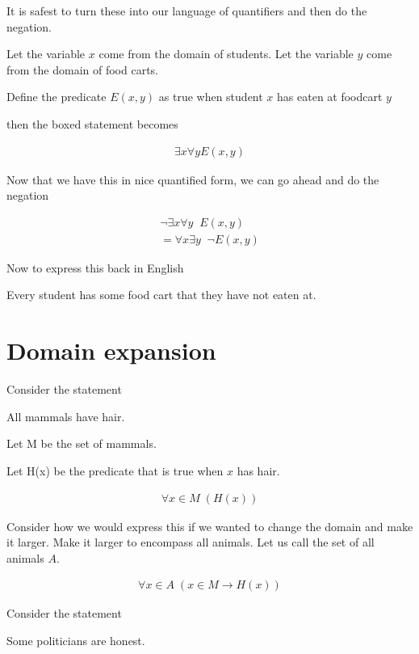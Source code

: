 \documentclass[12pt]{article}
\begin{document}
\medskip


\medskip

It is safest to turn these into our language of quantifiers and then do the negation.

Let the variable $x$ come from the domain of students. Let the variable $y$ come from the domain of food carts.

Define the predicate $E(x,y)$ as true when student $x$ has eaten at foodcart $y$

then the boxed statement becomes

\begin{align*}
\exists x \forall y E(x,y)
\end{align*}

Now that we have this in nice quantified form, we can go ahead and do the negation

\begin{align*}
\neg \exists x \forall y \; \; E(x,y) \\
= \forall x \exists y \; \; \neg E(x,y)
\end{align*}

Now to express this back in English

Every student has some food cart that they have not eaten at.

\section*{Domain expansion}
Consider the statement

All mammals have hair.

Let M be the set of mammals.

Let H(x) be the predicate that is true when $x$ has hair.

\begin{align*}
\forall x \in M \; (H(x))
\end{align*}

Consider how we would express this if we wanted to change the domain and make it larger. Make it larger to encompass all animals. Let us call the set of all animals $A$.

\begin{align*}
\forall x \in A \; (x \in M \rightarrow H(x))
\end{align*}

Consider the statement 

Some politicians are honest.
\end{document}
